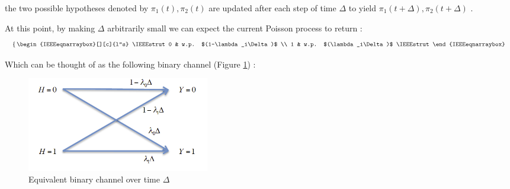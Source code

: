\documentclass[12pt]{article}
\newcommand{\curlyBracket}[1]{
		\begin{equation*}
			\left\{ \,
			\begin{IEEEeqnarraybox}[][c]{l"s}
				\IEEEstrut
					#1
				\IEEEstrut
			\end{IEEEeqnarraybox}
			\right.
		\end{equation*}
	}
\begin{document}
	the two possible hypotheses denoted by $\pi_1(t), \pi_2(t)$ are updated after each step of time $\Delta$ to yield 
	$\pi_1(t+\Delta), \pi_2(t+\Delta)$
.\\\par
At this point, by making $\Delta$ arbitrarily small we can expect the current Poisson process to return
:\\	\curlyBracket{
		0 & w.p. $(1-\lambda_i\Delta)$
\\		1 & w.p. $(\lambda_i\Delta)$
	}
Which can be thought of as the following binary channel (Figure \ref{fig:channel})
:\pagebreak[2]
	\begin{figure}[H]
		\centering
		\includegraphics[width=8cm]{channel.png}
		\caption{Equivalent binary channel over time $\Delta$}
		\label{fig:channel}
	\end{figure}
\end{document}
